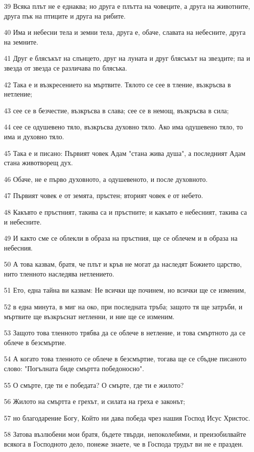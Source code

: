 \par 39 Всяка плът не е еднаква; но друга е плътта на човеците, а друга на животните, друга пък на птиците и друга на рибите.
\par 40 Има и небесни тела и земни тела, друга е, обаче, славата на небесните, друга на земните.
\par 41 Друг е блясъкът на слънцето, друг на луната и друг блясъкът на звездите; па и звезда от звезда се различава по блясъка.
\par 42 Така е и възкресението на мъртвите. Тялото се сее в тление, възкръсва в нетление;
\par 43 сее се в безчестие, възкръсва в слава; сее се в немощ, възкръсва в сила;
\par 44 сее се одушевено тяло, възкръсва духовно тяло. Ако има одушевено тяло, то има и духовно тяло.
\par 45 Така е и писано: Първият човек Адам "стана жива душа", а последният Адам стана животворещ дух.
\par 46 Обаче, не е първо духовното, а одушевеното, и после духовното.
\par 47 Първият човек е от земята, пръстен; вторият човек е от небето.
\par 48 Какъвто е пръстният, такива са и пръстните; и какъвто е небесният, такива са и небесните.
\par 49 И както сме се облекли в образа на пръстния, ще се облечем и в образа на небесния.
\par 50 А това казвам, братя, че плът и кръв не могат да наследят Божието царство, нито тленното наследява нетлението.
\par 51 Ето, една тайна ви казвам: Не всички ще починем, но всички ще се изменим,
\par 52 в една минута, в миг на око, при последната тръба; защото тя ще затръби, и мъртвите ще възкръснат нетленни, и ние ще се изменим.
\par 53 Защото това тленното трябва да се облече в нетление, и това смъртното да се облече в безсмъртие.
\par 54 А когато това тленното се облече в безсмъртие, тогава ще се сбъдне писаното слово: "Погълната биде смъртта победоносно".
\par 55 О смърте, где ти е победата? О смърте, где ти е жилото?
\par 56 Жилото на смъртта е грехът, и силата на греха е законът;
\par 57 но благодарение Богу, Който ни дава победа чрез нашия Господ Исус Христос.
\par 58 Затова възлюбени мои братя, бъдете твърди, непоколебими, и преизобилвайте всякога в Господното дело, понеже знаете, че в Господа трудът ви не е празден.

